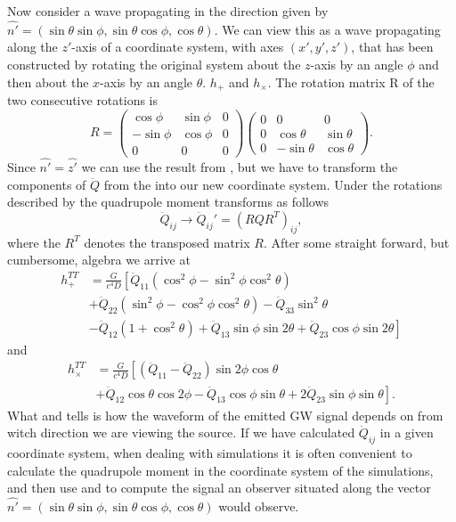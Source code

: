 Now consider a wave propagating in the direction given by $\hat{n'} = (\sin{\theta} \sin{\phi}, \sin{\theta} \cos{\phi},\cos{\theta})$.
We can view this as a wave propagating along the $z'$-axis of a coordinate system, with axes $(x',y',z')$, that has been constructed  
by rotating the original system about the $z$-axis by an angle $\phi$ and then about the $x$-axis by an angle $\theta$. $h_{+}$ and $h_{\times}$.
The rotation matrix R of the two consecutive rotations is
\begin{equation} \label{eqT:pjz}
R = 
  \begin{pmatrix}
    \cos{\phi} & \sin{\phi} & 0  \\
    -\sin{\phi} & \cos{\phi} & 0 \\
    0 & 0 & 0
  \end{pmatrix}
  \begin{pmatrix}
    0 & 0 & 0  \\
    0& \cos{\theta} & \sin{\theta} \\
    0 & -\sin{\theta} & \cos{\theta}
  \end{pmatrix}.
\end{equation}
Since $\hat{n'} = \hat{z'}$ we can use the result from , but we have to
transform the components of $\ddot{Q}$ from the into our new coordinate system.
Under the rotations described by  the quadrupole moment transforms as follows
\begin{equation}
\ddot{Q}_{ij} \rightarrow \ddot{Q}_{ij}' = (R Q R^T)_{ij},
\end{equation}
where the $R^T$ denotes the transposed matrix $R$.
After some straight forward, but cumbersome, algebra we arrive at
\begin{align}
\label{eqT:hp}
h_{+}^{TT} &= \frac{G}{c^4 D} \left [ \ddot{Q}_{11} (\cos^2{\phi} - \sin^2{\phi} \cos^2{\theta}) \right. \\ \nonumber
& + \ddot{Q}_{22} (\sin^2{\phi} - \cos^2{\phi} \cos^2{\theta}) - \ddot{Q}_{33} \sin^2{\theta} \\ \nonumber
&\left. - \ddot{Q}_{12} (1 + \cos^2{\theta}) + \ddot{Q}_{13} \sin{\phi} \sin{2\theta} + \ddot{Q}_{23} \cos{\phi} \sin{2\theta} \right ]
\end{align}
and
\begin{align}
\label{eqT:hc}
h_{\times}^{TT} &= \frac{G}{c^4 D} \left [ (\ddot{Q}_{11} - \ddot{Q}_{22}) \sin{2\phi}\cos{\theta} \right. \\ \nonumber
&\left. +\ddot{Q}_{12} \cos{\theta} \cos{2\phi} - \ddot{Q}_{13} \cos{\phi} \sin{\theta} +  2\ddot{Q}_{23} \sin{\phi} \sin{\theta} \right ]. 
\end{align}
What  and  tells is how the waveform of the emitted GW signal depends on from witch direction we are viewing the source.
If we have calculated $\ddot{Q}_{ij}$ in a given coordinate system, when dealing with simulations it is often convenient to calculate the quadrupole moment
in the coordinate system of the simulations, and then use  and  to compute the signal an observer situated along the
vector $\hat{n'} = (\sin{\theta} \sin{\phi}, \sin{\theta} \cos{\phi},\cos{\theta})$ would observe.

